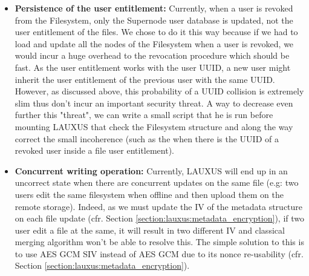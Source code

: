 \documentclass[../main.tex]{subfiles}
\begin{document}
\begin{itemize}
    \item \textbf{Persistence of the user entitlement:} Currently, when a user is revoked from the Filesystem, only the Supernode user database is updated, not the user entitlement of the files. We chose to do it this way because if we had to load and update all the nodes of the Filesystem when a user is revoked, we would incur a huge overhead to the revocation procedure which should be fast. As the user entitlement works with the user UUID, a new user might inherit the user entitlement of the previous user with the same UUID. However, as discussed above, this probability of a UUID collision is extremely slim thus don't incur an important security threat. A way to decrease even further this "threat", we can write a small script that he is run before mounting LAUXUS that check the Filesystem structure and along the way correct the small incoherence (such as the when there is the UUID of a revoked user inside a file user entitlement).
    \item \textbf{Concurrent writing operation:} Currently, LAUXUS will end up in an uncorrect state when there are concurrent updates on the same file (e.g: two users edit the same filesystem when offline and then upload them on the remote storage). Indeed, as we must update the IV of the metadata structure on each file update (cfr. Section \ref{section:lauxus:metadata_encryption}), if two user edit a file at the same, it will result in two different IV and classical merging algorithm won't be able to resolve this. The simple solution to this is to use AES GCM SIV instead of AES GCM due to its nonce re-usability (cfr. Section \ref{section:lauxus:metadata_encryption}).
\end{itemize}
\end{document}
